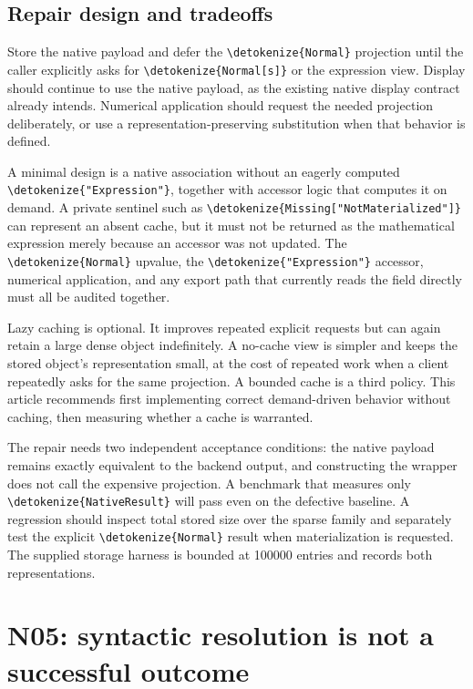 \documentclass[11pt]{article}
\newcommand{\code}[1]{{\ttfamily\expandafter\nolinkurl\expandafter{\detokenize{#1}}}}
\begin{document}
\subsection{Repair design and tradeoffs}
Store the native payload and defer the \code{Normal} projection until the caller explicitly asks for \code{Normal[s]} or the expression view. Display should continue to use the native payload, as the existing native display contract already intends. Numerical application should request the needed projection deliberately, or use a representation-preserving substitution when that behavior is defined.

A minimal design is a native association without an eagerly computed \code{"Expression"}, together with accessor logic that computes it on demand. A private sentinel such as \code{Missing["NotMaterialized"]} can represent an absent cache, but it must not be returned as the mathematical expression merely because an accessor was not updated. The \code{Normal} upvalue, the \code{"Expression"} accessor, numerical application, and any export path that currently reads the field directly must all be audited together.

Lazy caching is optional. It improves repeated explicit requests but can again retain a large dense object indefinitely. A no-cache view is simpler and keeps the stored object's representation small, at the cost of repeated work when a client repeatedly asks for the same projection. A bounded cache is a third policy. This article recommends first implementing correct demand-driven behavior without caching, then measuring whether a cache is warranted.

The repair needs two independent acceptance conditions: the native payload remains exactly equivalent to the backend output, and constructing the wrapper does not call the expensive projection. A benchmark that measures only \code{NativeResult} will pass even on the defective baseline. A regression should inspect total stored size over the sparse family and separately test the explicit \code{Normal} result when materialization is requested. The supplied storage harness is bounded at 100000 entries and records both representations.

\section{N05: syntactic resolution is not a successful outcome}
\end{document}
